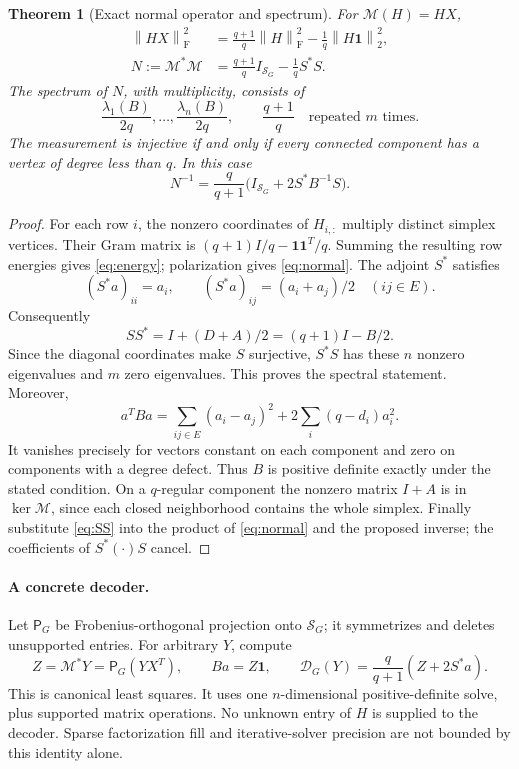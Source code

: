 \documentclass[11pt]{article}
\newtheorem{theorem}{Theorem}[section]
\theoremstyle{remark}\newtheorem{remark}[theorem]{Remark}
\newcommand{\one}{\mathbf 1}
\newcommand{\F}{\mathrm F}
\newcommand{\SG}{\mathcal S_G}
\newcommand{\M}{\mathcal M}
\newcommand{\Pp}{\mathsf P}
\newcommand{\norm}[1]{\left\lVert #1\right\rVert}
\begin{document}
\begin{theorem}[Exact normal operator and spectrum]\label{thm:normal}
For $\M(H)=HX$,
\begin{align}
\norm{HX}_{\F}^2&=\frac{q+1}{q}\norm H_{\F}^2-\frac1q\norm{H\one}_2^2,\label{eq:energy}\\
N:=\M^*\M&=\frac{q+1}{q}I_{\SG}-\frac1q S^*S.\label{eq:normal}
\end{align}
The spectrum of $N$, with multiplicity, consists of
\[
\frac{\lambda_1(B)}{2q},\ldots,\frac{\lambda_n(B)}{2q},
\qquad \frac{q+1}{q}\quad\text{repeated }m\text{ times}.
\]
The measurement is injective if and only if every connected component has a vertex of degree less than $q$. In this case
\begin{equation}\label{eq:inverse}
N^{-1}=\frac q{q+1}\bigl(I_{\SG}+2S^*B^{-1}S\bigr).
\end{equation}
\end{theorem}

\begin{proof}
For each row $i$, the nonzero coordinates of $H_{i,:}$ multiply distinct simplex vertices. Their Gram matrix is $(q+1)I/q-\one\one^T/q$. Summing the resulting row energies gives \eqref{eq:energy}; polarization gives \eqref{eq:normal}.
The adjoint $S^*$ satisfies
\[
(S^*a)_{ii}=a_i,\qquad(S^*a)_{ij}=(a_i+a_j)/2\quad(ij\in E).
\]
Consequently
\begin{equation}\label{eq:SS}
SS^*=I+(D+A)/2=(q+1)I-B/2.
\end{equation}
Since the diagonal coordinates make $S$ surjective, $S^*S$ has these $n$ nonzero eigenvalues and $m$ zero eigenvalues. This proves the spectral statement. Moreover,
\begin{equation}\label{eq:Benergy}
a^TBa=\sum_{ij\in E}(a_i-a_j)^2+2\sum_i(q-d_i)a_i^2.
\end{equation}
It vanishes precisely for vectors constant on each component and zero on components with a degree defect. Thus $B$ is positive definite exactly under the stated condition. On a $q$-regular component the nonzero matrix $I+A$ is in $\ker\M$, since each closed neighborhood contains the whole simplex. Finally substitute \eqref{eq:SS} into the product of \eqref{eq:normal} and the proposed inverse; the coefficients of $S^*(\cdot)S$ cancel.
\end{proof}

\paragraph{A concrete decoder.}
Let $\Pp_G$ be Frobenius-orthogonal projection onto $\SG$; it symmetrizes and deletes unsupported entries. For arbitrary $Y$, compute
\begin{equation}\label{eq:decoder}
Z=\M^*Y=\Pp_G(YX^T),\qquad Ba=Z\one,\qquad
\mathcal D_G(Y)=\frac q{q+1}(Z+2S^*a).
\end{equation}
This is canonical least squares. It uses one $n$-dimensional positive-definite solve, plus supported matrix operations. No unknown entry of $H$ is supplied to the decoder. Sparse factorization fill and iterative-solver precision are not bounded by this identity alone.
\end{document}
